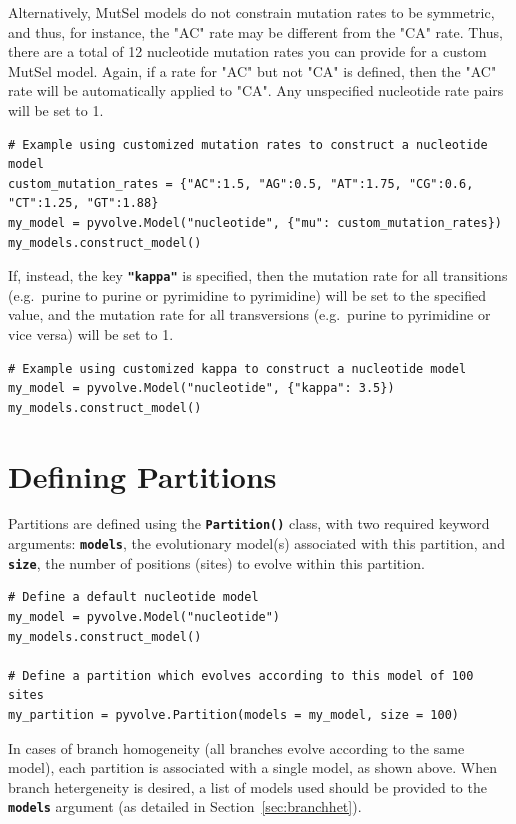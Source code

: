 \documentclass{article}
\newcommand{\code}[1]{\textbf{\texttt{\small{#1}}}}
\begin{document}
Alternatively, MutSel models do not constrain mutation rates to be symmetric, and thus, for instance, the "AC" rate may be different from the "CA" rate. Thus, there are a total of 12 nucleotide mutation rates you can provide for a custom MutSel model. Again, if a rate for "AC" but not "CA" is defined, then the "AC" rate will be automatically applied to "CA". Any unspecified nucleotide rate pairs will be set to 1. 
\begin{lstlisting}
# Example using customized mutation rates to construct a nucleotide model
custom_mutation_rates = {"AC":1.5, "AG":0.5, "AT":1.75, "CG":0.6, "CT":1.25, "GT":1.88}
my_model = pyvolve.Model("nucleotide", {"mu": custom_mutation_rates})
my_models.construct_model()
\end{lstlisting}

If, instead, the key \code{"kappa"} is specified, then the mutation rate for all transitions (e.g.\ purine to purine or pyrimidine to pyrimidine) will be set to the specified value, and the mutation rate for all transversions (e.g.\ purine to pyrimidine or vice versa) will be set to 1.
\begin{lstlisting}
# Example using customized kappa to construct a nucleotide model
my_model = pyvolve.Model("nucleotide", {"kappa": 3.5})
my_models.construct_model()
\end{lstlisting}


\section{Defining Partitions}\label{sec:partitions}

Partitions are defined using the \code{Partition()} class, with two required keyword arguments: \code{models}, the evolutionary model(s) associated with this partition, and \code{size}, the number of positions (sites) to evolve within this partition.
\begin{lstlisting}
# Define a default nucleotide model
my_model = pyvolve.Model("nucleotide")
my_models.construct_model()

# Define a partition which evolves according to this model of 100 sites
my_partition = pyvolve.Partition(models = my_model, size = 100)
\end{lstlisting}

In cases of branch homogeneity (all branches evolve according to the same model), each partition is associated with a single model, as shown above. When branch hetergeneity is desired, a list of models used should be provided to the \code{models} argument (as detailed in Section~\ref{sec:branchhet}).
\end{document}
